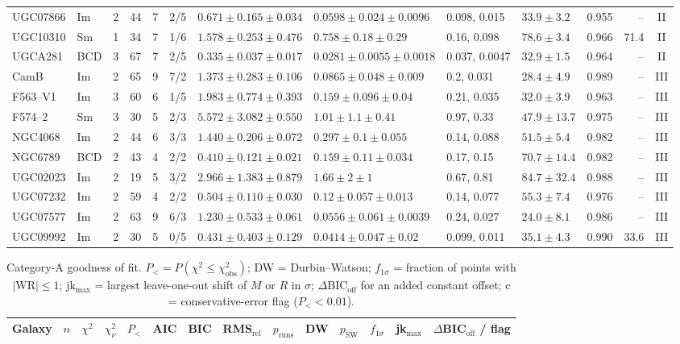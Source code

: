 \documentclass[10pt]{article}
\begin{document}
\begin{landscape}
{\begin{longtable}{llrrrrlllllrc}
UGC07866 & Im & 2 & 44 & 7 & 2/5 & $0.671\pm0.165\pm0.034$ & $0.0598\pm0.024\pm0.0096$ & 0.098, 0.015 & $33.9\pm3.2$ & 0.955 & -- & II\\
UGC10310 & Sm & 1 & 34 & 7 & 1/6 & $1.578\pm0.253\pm0.476$ & $0.758\pm0.18\pm0.29$ & 0.16, 0.098 & $78.6\pm3.4$ & 0.966 & 71.4 & II\\
UGCA281 & BCD & 3 & 67 & 7 & 2/5 & $0.335\pm0.037\pm0.017$ & $0.0281\pm0.0055\pm0.0018$ & 0.037, 0.0047 & $32.9\pm1.5$ & 0.964 & -- & II\\
CamB & Im & 2 & 65 & 9 & 7/2 & $1.373\pm0.283\pm0.106$ & $0.0865\pm0.048\pm0.009$ & 0.2, 0.031 & $28.4\pm4.9$ & 0.989 & -- & III\\
F563--V1 & Im & 3 & 60 & 6 & 1/5 & $1.983\pm0.774\pm0.393$ & $0.159\pm0.096\pm0.04$ & 0.21, 0.035 & $32.0\pm3.9$ & 0.963 & -- & III\\
F574--2 & Sm & 3 & 30 & 5 & 2/3 & $5.572\pm3.082\pm0.550$ & $1.01\pm1.1\pm0.41$ & 0.97, 0.33 & $47.9\pm13.7$ & 0.975 & -- & III\\
NGC4068 & Im & 2 & 44 & 6 & 3/3 & $1.440\pm0.206\pm0.072$ & $0.297\pm0.1\pm0.055$ & 0.14, 0.088 & $51.5\pm5.4$ & 0.982 & -- & III\\
NGC6789 & BCD & 2 & 43 & 4 & 2/2 & $0.410\pm0.121\pm0.021$ & $0.159\pm0.11\pm0.034$ & 0.17, 0.15 & $70.7\pm14.4$ & 0.982 & -- & III\\
UGC02023 & Im & 2 & 19 & 5 & 3/2 & $2.966\pm1.383\pm0.879$ & $1.66\pm2\pm1$ & 0.67, 0.81 & $84.7\pm32.4$ & 0.988 & -- & III\\
UGC07232 & Im & 2 & 59 & 4 & 2/2 & $0.504\pm0.110\pm0.030$ & $0.12\pm0.057\pm0.013$ & 0.14, 0.077 & $55.3\pm7.4$ & 0.976 & -- & III\\
UGC07577 & Im & 2 & 63 & 9 & 6/3 & $1.230\pm0.533\pm0.061$ & $0.0556\pm0.061\pm0.0039$ & 0.24, 0.027 & $24.0\pm8.1$ & 0.986 & -- & III\\
UGC09992 & Im & 2 & 30 & 5 & 0/5 & $0.431\pm0.403\pm0.129$ & $0.0414\pm0.047\pm0.02$ & 0.099, 0.011 & $35.1\pm4.3$ & 0.990 & 33.6 & III\\
\end{longtable}
\begin{longtable}{lrrrrrrrrrrrrc}
\caption{Category-A goodness of fit. $P_<=P(\chi^2\le\chi^2_\mathrm{obs})$; DW = Durbin--Watson; $f_{1\sigma}$ = fraction of points with $|\mathrm{WR}|\le1$; jk$_\mathrm{max}$ = largest leave-one-out shift of $M$ or $R$ in $\sigma$; $\Delta$BIC$_\mathrm{off}$ for an added constant offset; c = conservative-error flag ($P_<<0.01$).}\\\toprule
Galaxy & $n$ & $\chi^2$ & $\chi^2_\nu$ & $P_<$ & AIC & BIC & RMS$_\mathrm{rel}$ & $p_\mathrm{runs}$ & DW & $p_\mathrm{SW}$ & $f_{1\sigma}$ & jk$_\mathrm{max}$ & $\Delta$BIC$_\mathrm{off}$ / flag\\\midrule\endfirsthead

\end{longtable}}
\end{landscape}
\end{document}
